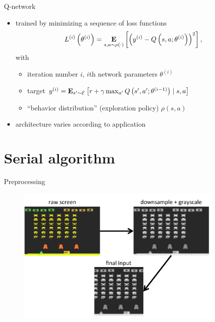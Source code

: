 \begin{frame}{Q-network}
    \begin{itemize}\itemsep=12pt

        \item trained by minimizing a sequence of loss functions
        \[
            L^{(i)}\left(\theta^{(i)}\right) =
            \mathop{\bf E{}}_{s,a \sim \rho\left(\cdot\right)}
            \left[\left(y^{(i)} - Q\left(s,a;\theta^{(i)}\right)\right)^{2}\right],
        \]
        with
        \vspace*{0.5em}
        \begin{itemize}
            \item iteration number $i$, $i$th network parameters $\theta^{(i)}$
            \item target $y^{(i)} = \mathop{\bf E{}}_{s'\sim\mathcal{E}}\left[ r + \gamma\max_{a'}Q\left(s',a';\theta^{(i-1)}\right) \mid s,a \right]$
            \item ``behavior distribution'' (exploration policy) $\rho\left(s,a\right)$
        \end{itemize}

        \item architecture varies according to application

    \end{itemize}
\end{frame}

\section{Serial algorithm}

\begin{frame}{Preprocessing}
    \begin{figure}
        \centering
        \includegraphics[width=0.9\textwidth]{process.pdf}
    \end{figure}
\end{frame}

